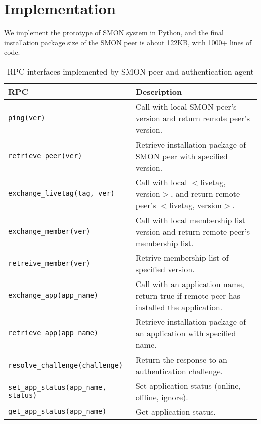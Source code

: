 \section{Implementation}
\label{sec:impl}

We implement the prototype of SMON system in Python, and the
final installation package size of the SMON peer is about
122KB, with 1000+ lines of code.

\begin{table*}
\small
\centering
\begin{tabular}{|l|l|}

\hline
\textbf{RPC} & \textbf{Description} \\

\hline
\texttt{ping(ver)} & Call with local SMON peer's version and
return remote peer's version.\\

\hline
\texttt{retrieve\_peer(ver)} & Retrieve installation package
of SMON peer with specified version.\\

\hline
\texttt{exchange\_livetag(tag, ver)} & Call with local
$<$livetag, version$>$, and return remote peer's $<$livetag,
version$>$.\\

\hline
\texttt{exchange\_member(ver)} & Call with local membership
list version and return remote peer's membership list.\\

\hline
\texttt{retreive\_member(ver)} & Retrive membership list of
specified version.\\

\hline
\texttt{exchange\_app(app\_name)} & Call with an application
name, return true if remote peer has installed the
application.\\

\hline
\texttt{retrieve\_app(app\_name)} & Retrieve installation package
of an application with specified name.\\

\hline
\texttt{resolve\_challenge(challenge)} & Return the response
to an authentication challenge.\\

\hline
\texttt{set\_app\_status(app\_name, status)} & Set application status (online,
offline, ignore).\\

\hline
\texttt{get\_app\_status(app\_name)} & Get application status. \\

\hline

\end{tabular}
\caption{RPC interfaces implemented by SMON peer and authentication
agent}
\label{fig:rpc}
\end{table*}

